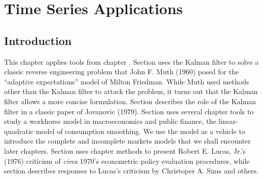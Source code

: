 %
%


\chapter{Time Series Applications\label{timeseriesapp}}
\def\toone{{t+1}}
\def\ttwo{{t+2}}
\def\tthree{{t+3}}
\def\Tone{{T+1}}
\def\TTT{{T-1}}
\def\rtr{{\rm tr}}
\def\epigraph#1#2{%
\begingroup
\smallskip
\leftskip=2em
\rightskip=0pt plus2em
\it\noindent #1\par
\noindent --- #2\par
\endgroup\noindent}
%
\def\frac#1#2{#1\over #2}
%


\section{Introduction}

This chapter applies tools from chapter .
  Section   %
  uses the
Kalman filter to solve a  classic reverse engineering problem that John F. Muth (1960)  posed for the ``adaptive expectations''  model of
Milton Friedman. While  Muth used   methods other than the Kalman filter  to attack the problem, it turns out that the Kalman
filter allows a more concise formulation. Section  %
 describes the  role of the Kalman filter  in
a classic paper of Jovanovic (1979). Section  uses several chapter   tools to
study   a workhorse  model in macroeconomics
and public finance, the linear-quadratic model of consumption smoothing.  We use the model as a vehicle  to introduce the complete and incomplete markets models that we shall
encounter  later chapters. Section  uses  chapter  methods to present Robert E. Lucas, Jr.'s (1976)
criticism of  {\it circa\/} 1970's econometric policy evaluation procedures, while section  describes   responses
to  Lucas's criticism by Christoper A. Sims and others.
%
%
%
%
%


